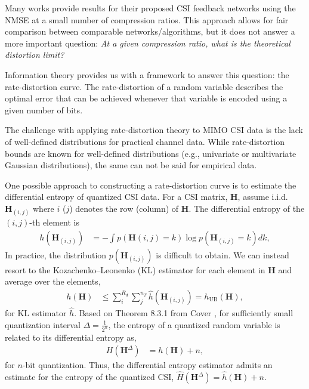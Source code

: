 Many works provide results for their proposed CSI feedback networks using the NMSE at a small number of compression ratios. This approach allows for fair comparison between comparable networks/algorithms, but it does not answer a more important question: \emph{At a given compression ratio, what is the theoretical distortion limit?}

Information theory provides us with a framework to answer this question: the rate-distortion curve. The rate-distortion of a random variable describes the optimal error that can be achieved whenever that variable is encoded using a given number of bits.

The challenge with applying rate-distortion theory to MIMO CSI data is the lack of well-defined distributions for practical channel data. While rate-distortion bounds are known for well-defined distributions (e.g., univariate or multivariate Gaussian distributions), the same can not be said for empirical data.

One possible approach to constructing a rate-distortion curve is to estimate the differential entropy of quantized CSI data. For a CSI matrix, $\mathbf{H}$, assume i.i.d. $\mathbf H_{(i,j)}$ where $i$ ($j$) denotes the row (column) of $\mathbf{H}$. The differential entropy of the $(i,j)$-th element is
\begin{align*}
	h(\mathbf H_{(i,j)}) &= - \int p(\mathbf H{(i,j)} = k) \log p(\mathbf H_{(i,j)} = k) dk,
\end{align*}
In practice, the distribution $p(\mathbf H_{(i,j)})$ is difficult to obtain. We can instead resort to the Kozachenko–Leonenko (KL) estimator \cite{ref:Kozachenko1987SampleEstimate} for each element in $\mathbf H$ and average over the elements,
\begin{align}
	h(\mathbf H) &\leq \sum_{i}^{R_d}\sum_{j}^{n_T} \hat h(\mathbf H_{(i,j)}) = h_{\text{UB}}(\mathbf H), \label{eq:csi-diff-ent}
\end{align}
for KL estimator $\hat h$. Based on Theorem 8.3.1 from Cover \cite{ref:Cover1999Elements}, for sufficiently small quantization interval $\Delta = \frac {1}{2^n}$, the entropy of a quantized random variable is related to its differential entropy as,
\begin{align}
  H(\mathbf H^{\Delta}) &= h(\mathbf H) + n, \label{eq:cover-thm}
\end{align}
for $n$-bit quantization. Thus, the differential entropy estimator admits an estimate for the entropy of the quantized CSI, $\hat H({\mathbf H}^\Delta) = \hat h(\mathbf H) + n$.

